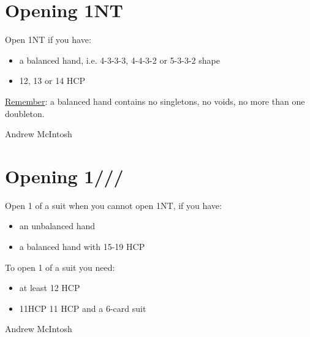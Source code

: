 \documentclass[14pt]{extarticle}
\begin{document}
\addtocounter{page}{5}
\newpage
\vspace*{\fill}
\begingroup
\centering
\section*{Opening 1NT}
\endgroup
Open 1NT if you have:\\
\begin{itemize}
\item a balanced hand, i.e. 4-3-3-3, 4-4-3-2 or 5-3-3-2 shape
\item 12, 13 or 14 HCP
\end{itemize}
\noindent \smallpencil \underline{Remember}: a balanced hand contains no singletons, no voids, no more than one doubleton.


\vspace*{\fill}
\begin{flushbottom}
 \begin{center}
 \tiny
 \textcopyright Andrew McIntosh
\end{center}
\end{flushbottom}


\newpage
\addtocounter{page}{1}

\vspace*{\fill}
\begingroup
\centering
\section*{Opening 1\textcolor{ForestGreen}{}/\textcolor{orange}{}/\textcolor{red}{}/\textcolor{blue}{}}
\endgroup
\noindent Open 1 of a suit when you cannot open 1NT, if you have:\\
\begin{itemize}
\item an unbalanced hand
\item a balanced hand with 15-19 HCP
\end{itemize}
\vspace{0.15in}
\noindent To open 1 of a suit you need:
\begin{itemize}
\item at least 12 HCP
\item 11HCP 11 HCP and a 6-card suit
\end{itemize}

\vspace*{\fill}
\begin{flushbottom}
 \begin{center}
 \tiny
 \textcopyright Andrew McIntosh
\end{center}
\end{flushbottom}
\end{document}
